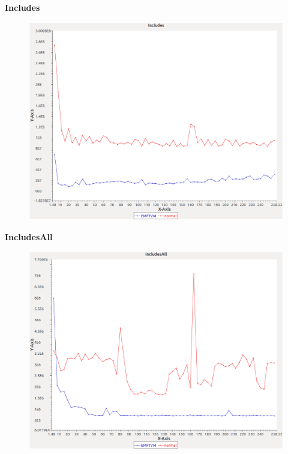 \noindent\textbf{Includes}

\begin{figure}[h]
\centering
\includegraphics[width=\textwidth]{graphs/sequence/Includes}
\end{figure}
\pagebreak

\noindent\textbf{IncludesAll}

\begin{figure}[h]
\centering
\includegraphics[width=\textwidth]{graphs/sequence/IncludesAll}
\end{figure}
\pagebreak

